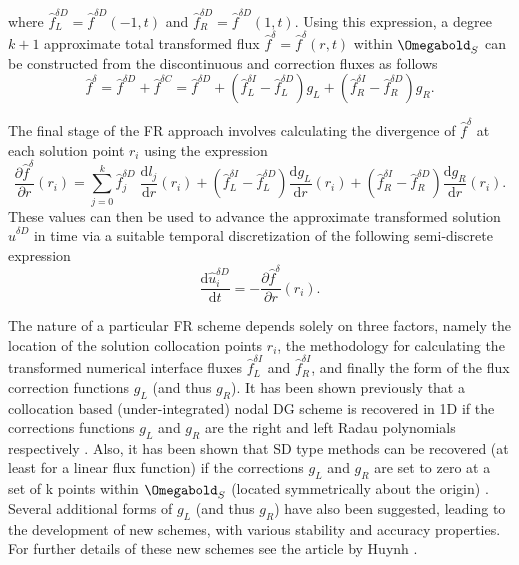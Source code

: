 \vspace{0.05 in}
\noindent where $\hat{f}^{\delta D}_L=\hat{f}^{\delta D}(-1,t)$ and $\hat{f}^{\delta D}_R=\hat{f}^{\delta D}(1,t)$. Using this expression, a degree $k+1$ approximate total transformed flux $\hat{f}^{\delta}=\hat{f}^{\delta}(r,t)$ within $\Omegabold_S$ can be constructed from the discontinuous and correction fluxes as follows
\begin{equation}
\hat{f}^{\delta}=\hat{f}^{\delta D}+\hat{f}^{\delta C}=\hat{f}^{\delta D}+(\hat{f}^{\delta I}_L-\hat{f}^{\delta D}_L)g_L+(\hat{f}^{\delta I}_R-\hat{f}^{\delta D}_R)g_R.
\label{f_total}
\end{equation}

\noindent The final stage of the FR approach involves calculating the divergence of $\hat{f}^{\delta}$ at each solution point $r_i$ using the expression
\begin{equation}
\frac{\partial\hat{f}^{\delta}}{\partial r}(r_i)=\sum_{j=0}^{k}\hat{f}^{\delta D}_j\;\frac{\mathrm{d}l_j}{\mathrm{d}r}(r_i)+(\hat{f}^{\delta I}_L-\hat{f}^{\delta D}_L)\frac{\mathrm{d}g_{L}}{\mathrm{d}r}(r_i)+(\hat{f}^{\delta I}_R-\hat{f}^{\delta D}_R)\frac{\mathrm{d}g_{R}}{\mathrm{d}r}(r_i).
\end{equation}
These values can then be used to advance the approximate transformed solution $\hat{u}^{\delta D}$ in time via a suitable temporal discretization of the following semi-discrete expression
\begin{equation}
\frac{\mathrm{d}\hat{u}^{\delta D}_i}{\mathrm{d}t}=-\frac{\partial\hat{f}^{\delta}}{\partial r}(r_i).
\label{semi_disc}
\end{equation}

\noindent The nature of a particular FR scheme depends solely on three factors, namely the location of the solution collocation points $r_i$, the methodology for calculating the transformed numerical interface fluxes $\hat{f}^{\delta I}_L$ and $\hat{f}^{\delta I}_R$, and finally the form of the flux correction functions $g_L$ (and thus $g_R$). It has been shown previously that a collocation based (under-integrated) nodal DG scheme is recovered in 1D if the corrections functions $g_L$ and $g_R$ are the right and left Radau polynomials respectively \cite{Huynh07}. Also, it has been shown that SD type methods can be recovered (at least for a linear flux function) if the corrections $g_L$ and $g_R$ are set to zero at a set of k points within $\Omegabold_S$ (located symmetrically about the origin) \cite{Jameson10}. Several additional forms of $g_L$ (and thus $g_R$) have also been suggested, leading to the development of new schemes, with various stability and accuracy properties. For further details of these new schemes see the article by Huynh \cite{Huynh07}.

